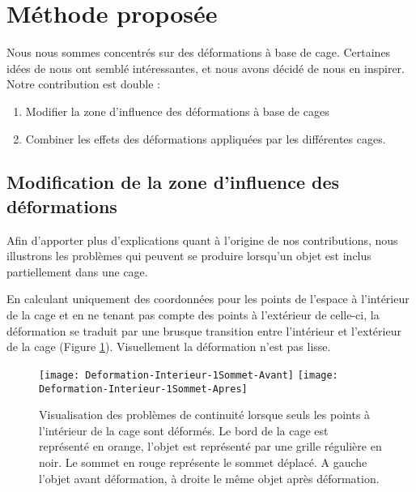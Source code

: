 \section{Méthode proposée}

Nous nous sommes concentrés sur des déformations à base de cage. Certaines
idées de \cite{GPCP13} nous ont semblé intéressantes, et nous avons décidé de
nous en inspirer. Notre contribution est double :

\begin{enumerate}

\item Modifier la zone d'influence des déformations à base de cages

\item Combiner les effets des déformations appliquées par les différentes
cages.

\end{enumerate}

\subsection{Modification de la zone d'influence des déformations}

Afin d'apporter plus d'explications quant à l'origine de nos contributions,
nous illustrons les problèmes qui peuvent se produire lorsqu'un objet est
inclus partiellement dans une cage.

En calculant uniquement des coordonnées pour les points de l'espace à
l'intérieur de la cage et en ne tenant pas compte des points à l'extérieur de
celle-ci, la déformation se traduit par une brusque transition entre
l'intérieur et l'extérieur de la cage (Figure \ref{MELVI}). Visuellement la
déformation n'est pas lisse.

\begin{figure}[!ht]
    \scalebox{0.2}
    {
      \texttt{[image: Deformation-Interieur-1Sommet-Avant]}
      \texttt{[image: Deformation-Interieur-1Sommet-Apres]}
    }

    \caption[Problème de continuité déformation naïve] {Visualisation des
problèmes de continuité lorsque seuls les points à l'intérieur de la cage sont
déformés. Le bord de la cage est représenté en orange, l'objet est représenté
par une grille régulière en noir. Le sommet en rouge représente le sommet
déplacé. A gauche l'objet avant déformation, à droite le même objet après
déformation.}

    \label{MELVI}
\end{figure}

